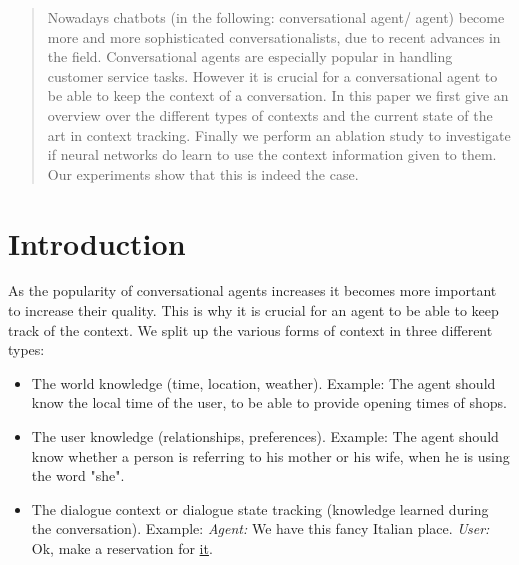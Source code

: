 \documentclass[conference]{IEEEtran}
\begin{document}
\begin{abstract}
Nowadays chatbots (in the following: conversational agent/ agent) become more and more sophisticated conversationalists, due to recent advances in the field. Conversational agents are especially popular in handling customer service tasks. However it is crucial for a conversational agent to be able to keep the context of a conversation.
In this paper we first give an overview over the different types of contexts and the current state of the art in context tracking. Finally we perform an ablation study to investigate if neural networks do learn to use the context information given to them. Our experiments show that this is indeed the case.
\end{abstract}





%
\IEEEpeerreviewmaketitle



\section{Introduction}
As the popularity of conversational agents increases it becomes more important to increase their quality. This is why it is crucial for an agent to be able to keep track of the context. We split up the various forms of context\cite{chopra2017my,williams2013dialog} in three different types: 
\begin{itemize}
\item{The world knowledge (time, location, weather). Example: The agent should know the local time of the user, to be able to provide opening times of shops.}
\item{The user knowledge (relationships, preferences). Example: The agent should know whether a person is referring to his mother or his wife, when he is using the word "she". }
\item{The dialogue context or dialogue state tracking (knowledge learned during the conversation). Example: \emph{Agent:} We have this fancy Italian place. \emph{User:} Ok, make a reservation for \underline{it}.}
\end{itemize}
\end{document}
